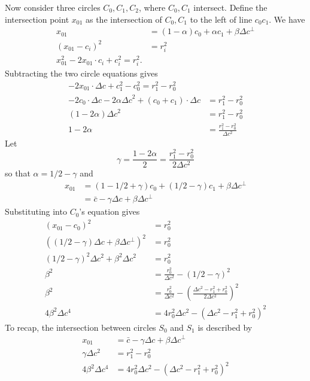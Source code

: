\documentclass[11pt]{article}
\begin{document}
Now consider three circles $C_0,C_1,C_2$, where $C_0,C_1$ intersect.  Define the intersection point $x_{01}$ as the intersection
of $C_0,C_1$ to the left of line $c_0c_1$.  We have
\begin{align*}
x_{01} &= (1-\alpha) c_0 + \alpha c_1 + \beta \Delta c^\perp \\
(x_{01} - c_i)^2 &= r_i^2 \\
x_{01}^2 - 2x_{01} \cdot c_i + c_i^2 = r_i^2.
\end{align*}
Subtracting the two circle equations gives
\begin{align*}
-2x_{01} \cdot \Delta c + c_1^2 - c_0^2 = r_1^2 - r_0^2 \\
-2c_0 \cdot \Delta c -2\alpha {\Delta c}^2 + (c_0 + c_1) \cdot \Delta c &= r_1^2 - r_0^2 \\
(1-2\alpha) {\Delta c}^2 &= r_1^2 - r_0^2 \\
1 - 2 \alpha &= \frac{r_1^2 - r_0^2}{\Delta c^2}
\end{align*}
Let
$$\gamma = \frac{1 - 2\alpha}{2} = \frac{r_1^2 - r_0^2}{2\Delta c^2}$$
so that $\alpha = 1/2 - \gamma$ and
\begin{align*}
x_{01} &= (1-1/2 + \gamma) c_0 + (1/2 - \gamma) c_1 + \beta \Delta c^\perp \\
       &= \bar{c} - \gamma \Delta c + \beta \Delta c^\perp
\end{align*}
Substituting into $C_0$'s equation gives
\begin{align*}
(x_{01} - c_0)^2 &= r_0^2 \\
\left((1/2 - \gamma) \Delta c + \beta \Delta c^\perp \right)^2 &= r_0^2 \\
(1/2 - \gamma)^2 \Delta c^2 + \beta^2 \Delta c^2 &= r_0^2 \\
\beta^2 &= \frac{r_0^2}{\Delta c^2} - (1/2 - \gamma)^2 \\
\beta^2 &= \frac{r_0^2}{\Delta c^2} - \left(\frac{\Delta c^2 - r_1^2 + r_0^2}{2 \Delta c^2}\right)^2 \\
4 \beta^2 \Delta c^4 &= 4 r_0^2 \Delta c^2 - \left( \Delta c^2 - r_1^2 + r_0^2 \right)^2
\end{align*}
To recap, the intersection between circles $S_0$ and $S_1$ is described by
\begin{align*}
x_{01} &= \bar{c} - \gamma \Delta c + \beta \Delta c^\perp \\
\gamma \Delta c^2 &= r_1^2 - r_0^2 \\
4 \beta^2 \Delta c^4 &= 4 r_0^2 \Delta c^2 - \left( \Delta c^2 - r_1^2 + r_0^2 \right)^2
\end{align*}
\end{document}
